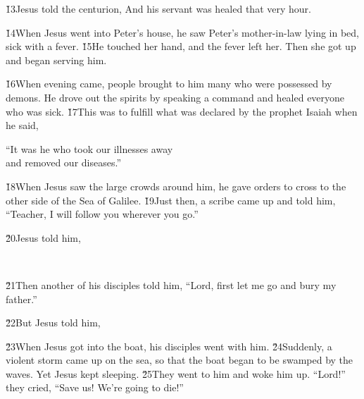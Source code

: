 \v{13}Jesus told the centurion,  And his servant was healed that very hour.

\v{14}When Jesus went into Peter's house, he saw Peter's mother-in-law lying in bed, sick with a fever. \v{15}He touched her hand, and the fever left her. Then she got up and began serving him.

\v{16}When evening came, people brought to him many who were possessed by demons. He drove out the spirits by speaking a command and healed everyone who was sick. \v{17}This was to fulfill what was declared by the prophet Isaiah when he said,

\begin{poetry}
\poeml ``It was he who took our illnesses away \\
\poemll    and removed our diseases.''
\end{poetry}

\v{18}When Jesus saw the large crowds around him, he gave orders to cross to the other side of the Sea of Galilee. \v{19}Just then, a scribe came up and told him, ``Teacher, I will follow you wherever you go.''

\v{20}Jesus told him,

\begin{poetry}
\poeml {} \\
\poemll    {}
\end{poetry}

\v{21}Then another of his disciples told him, ``Lord, first let me go and bury my father.''

\v{22}But Jesus told him, 

\v{23}When Jesus got into the boat, his disciples went with him. \v{24}Suddenly, a violent storm came up on the sea, so that the boat began to be swamped by the waves. Yet Jesus kept sleeping. \v{25}They went to him and woke him up. ``Lord!'' they cried, ``Save us! We're going to die!''

